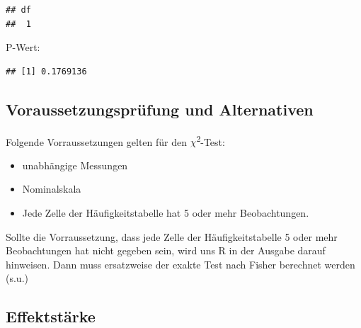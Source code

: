 \documentclass[
]{book}
\newenvironment{Shaded}{\begin{snugshade}}{\end{snugshade}}
\newcommand{\FunctionTok}[1]{\textcolor[rgb]{0.00,0.00,0.00}{#1}}
\newcommand{\NormalTok}[1]{#1}
\newcommand{\SpecialCharTok}[1]{\textcolor[rgb]{0.00,0.00,0.00}{#1}}
\providecommand{\tightlist}{%
  \setlength{\itemsep}{0pt}\setlength{\parskip}{0pt}}
\begin{document}
\begin{Shaded}
\end{Shaded}

\begin{verbatim}
## df 
##  1
\end{verbatim}

P-Wert:

\begin{Shaded}
\end{Shaded}

\begin{verbatim}
## [1] 0.1769136
\end{verbatim}

\hypertarget{voraussetzungspruxfcfung-und-alternativen-2}{%
\subsection{Voraussetzungsprüfung und Alternativen}\label{voraussetzungspruxfcfung-und-alternativen-2}}

Folgende Vorraussetzungen gelten für den \(\chi\)\textsuperscript{2}-Test:

\begin{itemize}
\tightlist
\item
  unabhängige Messungen
\item
  Nominalskala
\item
  Jede Zelle der Häufigkeitstabelle hat 5 oder mehr Beobachtungen.
\end{itemize}

Sollte die Vorraussetzung, dass jede Zelle der Häufigkeitstabelle 5 oder mehr Beobachtungen hat nicht gegeben sein, wird uns R in der Ausgabe darauf hinweisen. Dann muss ersatzweise der exakte Test nach Fisher berechnet werden (s.u.)

\hypertarget{effektstuxe4rke-5}{%
\subsection{Effektstärke}\label{effektstuxe4rke-5}}
\end{document}
